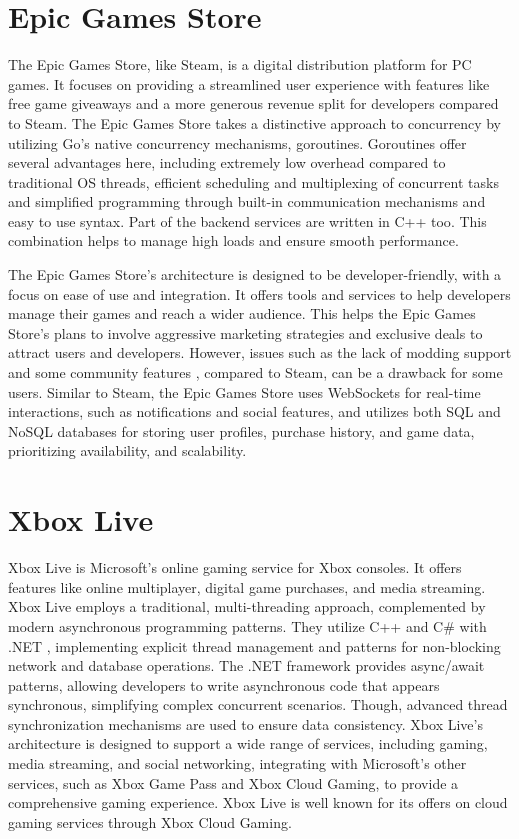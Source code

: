 \documentclass[]{final}
\begin{document}
\section{Epic Games Store}
The Epic Games Store, like Steam, is a digital distribution platform for
PC games. It focuses on providing a streamlined user experience with features
like free game giveaways and a more generous revenue split for developers
compared to Steam. The Epic Games Store takes a distinctive approach to concurrency by utilizing
Go's native concurrency mechanisms, goroutines\cite{epic_games_jobs}. Goroutines offer several
advantages here, including extremely low overhead compared to traditional OS threads,
efficient scheduling and multiplexing of concurrent tasks and simplified
programming through built-in communication mechanisms and easy to use syntax.
Part of the backend services are written in C++ too\cite{epic_games_jobs}. This combination
helps to manage high loads and ensure smooth performance.

The Epic Games Store's architecture is designed to be developer-friendly, with a
focus on ease of use and integration. It offers tools and services to help
developers manage their games and reach a wider audience. This helps the Epic Games
Store's plans to involve aggressive marketing strategies and exclusive
deals to attract users and developers. However, issues such as the lack of modding support and
some community features \cite{epic_games_dev_update}, compared to Steam, can be a drawback for some users.
Similar to Steam, the Epic Games Store uses WebSockets for real-time interactions,
such as notifications and social features, and utilizes both SQL and NoSQL
databases for storing user profiles, purchase history, and game data,
\cite{spring_epic_2016, epic_games_jobs} prioritizing availability, and scalability.

\section{Xbox Live}
Xbox Live is Microsoft's online gaming service for Xbox consoles. It offers
features like online multiplayer, digital game purchases, and media streaming.
Xbox Live employs a traditional, multi-threading approach, complemented by modern
asynchronous programming patterns. They utilize C++ and C\# with .NET \cite{kevinasgari_microsoft.xbox.services_nodate}, implementing
explicit thread management and patterns for non-blocking network and database operations.
The .NET framework provides async/await patterns, allowing developers to write
asynchronous code that appears synchronous, simplifying complex concurrent scenarios.
Though, advanced thread synchronization mechanisms are used to ensure data consistency.
\cite{m-stahl_sdk_2023, woolsey_how_2024} Xbox Live's architecture is designed to support a wide range of services, including gaming,
media streaming, and social networking, integrating with Microsoft's other services, such as Xbox Game
Pass and Xbox Cloud Gaming, to provide a comprehensive gaming experience. Xbox Live is well known
for its offers on cloud gaming services through Xbox Cloud Gaming.
\end{document}

